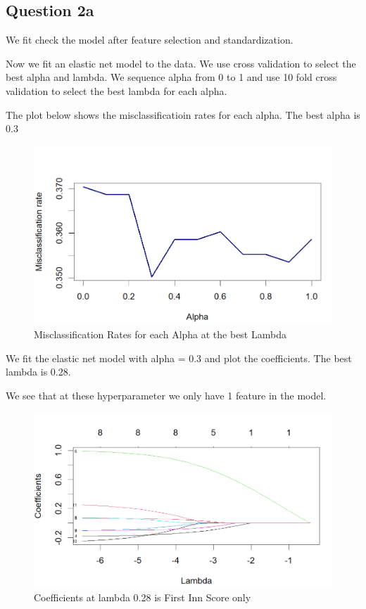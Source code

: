 \documentclass[
]{article}
\begin{document}
\hypertarget{question-2a}{%
\subsection{Question 2a}\label{question-2a}}

We fit check the model after feature selection and standardization.

Now we fit an elastic net model to the data. We use cross validation to
select the best alpha and lambda. We sequence alpha from 0 to 1 and use
10 fold cross validation to select the best lambda for each alpha.

The plot below shows the misclassificatioin rates for each alpha. The
best alpha is 0.3

\begin{figure}
\centering
\includegraphics{misclass_rate_ipl.png}
\caption{Misclassification Rates for each Alpha at the best Lambda}
\end{figure}

We fit the elastic net model with alpha = 0.3 and plot the coefficients.
The best lambda is 0.28.

We see that at these hyperparameter we only have 1 feature in the model.

\begin{figure}
\centering
\includegraphics{coef_ipl.png}
\caption{Coefficients at lambda 0.28 is First Inn Score only}
\end{figure}
\end{document}

